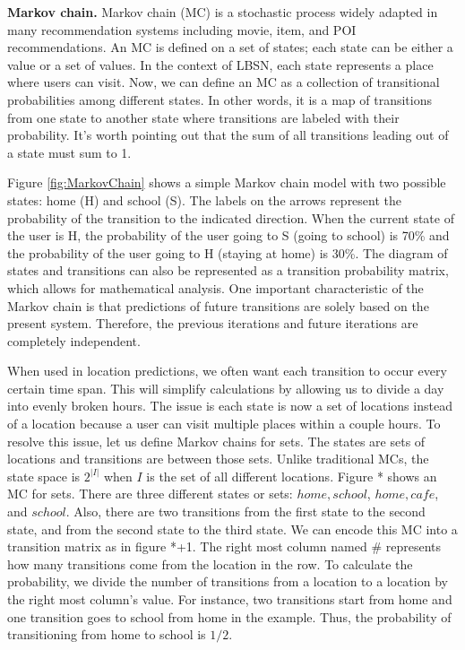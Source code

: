 \documentclass{sig-alternate}
\begin{document}
\textbf{Markov chain.} Markov chain (MC) is a stochastic process widely adapted in many recommendation systems 
including movie, item, and POI recommendations. An MC is defined on a set of states; each state can be either a value
or a set of values. In the context of LBSN, each state represents a place where users can visit.
Now, we can define an MC as a collection of transitional probabilities among different states.
In other words, it is a map of transitions from one state to another state where transitions are labeled with their probability.  
It's worth pointing out that the sum of all transitions leading out of a state must sum to 1.

Figure \ref{fig:MarkovChain} shows a simple Markov chain 
model with two possible states: home (H) and school (S). The labels on the arrows represent 
the probability of the transition to the indicated direction. When the current state of the 
user is H, the probability of the user going to S (going to school) is 70\% and the probability of the 
user going to H (staying at home) is 30\%. The diagram of states and transitions can also be 
represented as a transition probability matrix, which allows for mathematical analysis. One important 
characteristic of the Markov chain is that predictions of future transitions are solely based on the present 
system. Therefore, the previous iterations and future iterations are completely independent. 

When used in location predictions, we often want each transition to occur every certain time span.
This will simplify calculations by allowing us to divide a day into evenly broken hours. The issue is each state is now 
a set of locations instead of a location because a user can visit multiple places within a couple hours. 
To resolve this issue, let us define Markov chains for sets. The states are sets of locations and transitions are 
between those sets. Unlike traditional MCs, the state space is $2^{|I|}$ when 
$I$ is the set of all different locations. Figure * shows an MC for sets. There are three different states or sets:
${home, school}$, ${home, cafe}$, and ${school}$. Also, there are two transitions from the first state to the second 
state, and from the second state to the third state. We can encode this MC into a transition matrix as in 
figure *+1. The right most column named \# represents how many transitions come from the location in the row.
To calculate the probability, we divide the number of transitions from a location to a location by the right most 
column's value. For instance, two transitions start from home and one transition goes to school from home in
the example. Thus, the probability of transitioning from home to school is $1/2$. 
\end{document}
